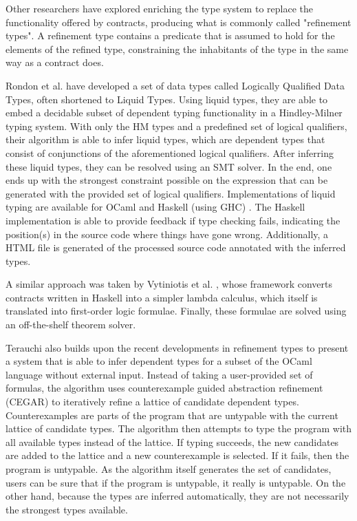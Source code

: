 \documentclass[10pt]{report}
\begin{document}
Other researchers have explored enriching the type system to replace the functionality offered by contracts, producing what is commonly called "refinement types".
A refinement type contains a predicate that is assumed to hold for the elements of the refined type, constraining the inhabitants of the type in the same way as a contract does.

Rondon et al. \cite{rondon2008liquid} have developed a set of data types called Logically Qualified Data Types, often shortened to Liquid Types.
Using liquid types, they are able to embed a decidable subset of dependent typing functionality in a Hindley-Milner typing system.
With only the HM types and a predefined set of logical qualifiers, their algorithm is able to infer liquid types, which are dependent types that consist of conjunctions of the aforementioned logical qualifiers.
After inferring these liquid types, they can be resolved using an SMT solver.
In the end, one ends up with the strongest constraint possible on the expression that can be generated with the provided set of logical qualifiers.
Implementations of liquid typing are available for OCaml \cite{rondon2008liquid} and Haskell (using GHC) \cite{rondon2013refinement}.
The Haskell implementation is able to provide feedback if type checking fails, indicating the position(s) in the source code where things have gone wrong.
Additionally, a HTML file is generated of the processed source code annotated with the inferred types.

A similar approach was taken by Vytiniotis et al. \cite{Vytiniotis:2013ww}, whose framework converts contracts written in Haskell into a simpler lambda calculus, which itself is translated into first-order logic formulae.
Finally, these formulae are solved using an off-the-shelf theorem solver.

Terauchi \cite{terauchi2010dependent} also builds upon the recent developments in refinement types to present a system that is able to infer dependent types for a subset of the OCaml language without external input.
Instead of taking a user-provided set of formulas, the algorithm uses counterexample guided abstraction refinement (CEGAR) to iteratively refine a lattice of candidate dependent types.
Counterexamples are parts of the program that are untypable with the current lattice of candidate types.
The algorithm then attempts to type the program with all available types instead of the lattice.
If typing succeeds, the new candidates are added to the lattice and a new counterexample is selected.
If it fails, then the program is untypable.
As the algorithm itself generates the set of candidates, users can be sure that if the program is untypable, it really is untypable.
On the other hand, because the types are inferred automatically, they are not necessarily the strongest types available.
\end{document}
